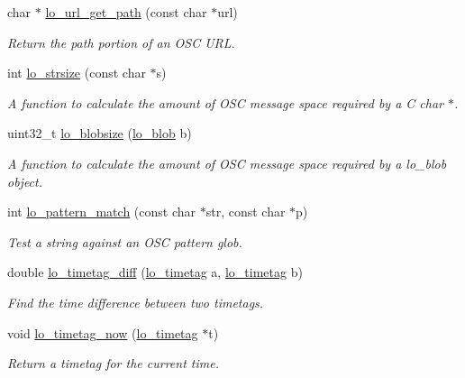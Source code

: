 \begin{DoxyCompactItemize}
char $\ast$ \hyperlink{group__liblolowlevel_ga617d046cc702a2c5ab8539659381ef18}{lo\+\_\+url\+\_\+get\+\_\+path} (const char $\ast$url)
\begin{DoxyCompactList}\small\item\em Return the path portion of an O\+S\+C U\+R\+L. \end{DoxyCompactList}\item 
int \hyperlink{group__liblolowlevel_gae62aa870bad161e4507f6338820ac243}{lo\+\_\+strsize} (const char $\ast$s)
\begin{DoxyCompactList}\small\item\em A function to calculate the amount of O\+S\+C message space required by a C char $\ast$. \end{DoxyCompactList}\item 
uint32\+\_\+t \hyperlink{group__liblolowlevel_ga2315f71c3832c365bce25d9b21726043}{lo\+\_\+blobsize} (\hyperlink{lo__types_8h_a8e780f8c09e3e4dd737fe249f11d16fc}{lo\+\_\+blob} b)
\begin{DoxyCompactList}\small\item\em A function to calculate the amount of O\+S\+C message space required by a lo\+\_\+blob object. \end{DoxyCompactList}\item 
int \hyperlink{group__liblolowlevel_gac26f3d15dbd23f34d4f9e4f6f0b81bbb}{lo\+\_\+pattern\+\_\+match} (const char $\ast$str, const char $\ast$p)
\begin{DoxyCompactList}\small\item\em Test a string against an O\+S\+C pattern glob. \end{DoxyCompactList}\item 
double \hyperlink{group__liblolowlevel_ga9937fce1bfce695b01cd3289ead8b919}{lo\+\_\+timetag\+\_\+diff} (\hyperlink{structlo__timetag}{lo\+\_\+timetag} a, \hyperlink{structlo__timetag}{lo\+\_\+timetag} b)
\begin{DoxyCompactList}\small\item\em Find the time difference between two timetags. \end{DoxyCompactList}\item 
void \hyperlink{group__liblolowlevel_gad687e21ed611e68748e962502ae63d8e}{lo\+\_\+timetag\+\_\+now} (\hyperlink{structlo__timetag}{lo\+\_\+timetag} $\ast$t)
\begin{DoxyCompactList}\small\item\em Return a timetag for the current time. \end{DoxyCompactList}\item 

\end{DoxyCompactItemize}
